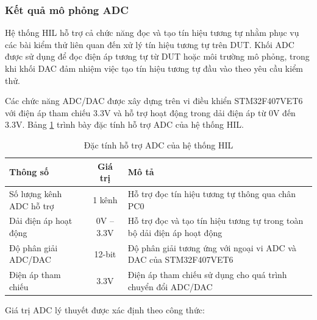 
\subsubsection{Kết quả mô phỏng ADC}

Hệ thống HIL hỗ trợ cả chức năng đọc và tạo tín hiệu tương tự nhằm phục vụ các bài kiểm thử liên quan đến xử lý tín hiệu tương tự trên DUT. Khối ADC được sử dụng để đọc điện áp tương tự từ DUT hoặc môi trường mô phỏng, trong khi khối DAC đảm nhiệm việc tạo tín hiệu tương tự đầu vào theo yêu cầu kiểm thử.

Các chức năng ADC/DAC được xây dựng trên vi điều khiển STM32F407VET6 với điện áp tham chiếu 3.3V và hỗ trợ hoạt động trong dải điện áp từ 0V đến 3.3V. Bảng \ref{tab:adc_support} trình bày đặc tính hỗ trợ ADC của hệ thống HIL.

\begin{table}[H]
\centering
\caption{Đặc tính hỗ trợ ADC của hệ thống HIL}
\label{tab:adc_support}
\renewcommand{\arraystretch}{1.2}

\begin{tabularx}{\textwidth}{|l|c|X|}
\hline
\textbf{Thông số} & \textbf{Giá trị} & \textbf{Mô tả} \\
\hline

Số lượng kênh ADC hỗ trợ 
& 1 kênh 
& Hỗ trợ đọc tín hiệu tương tự thông qua chân PC0 \\
\hline

Dải điện áp hoạt động 
& 0V -- 3.3V 
& Hỗ trợ đọc và tạo tín hiệu tương tự trong toàn bộ dải điện áp hoạt động \\
\hline

Độ phân giải ADC/DAC 
& 12-bit 
& Độ phân giải tương ứng với ngoại vi ADC và DAC của STM32F407VET6 \\
\hline

Điện áp tham chiếu 
& 3.3V 
& Điện áp tham chiếu sử dụng cho quá trình chuyển đổi ADC/DAC \\
\hline

\end{tabularx}
\end{table}

Giá trị ADC lý thuyết được xác định theo công thức:

